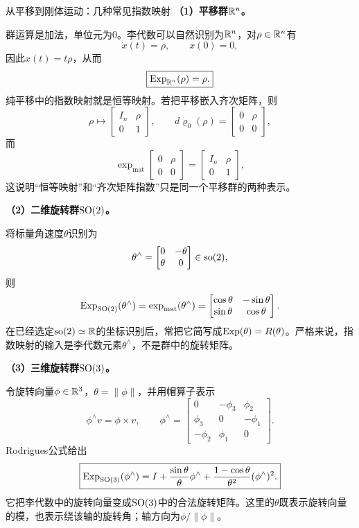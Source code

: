 \begin{lieexample}{从平移到刚体运动：几种常见指数映射}
\textbf{（1）平移群$\mathbb{R}^n$。}

群运算是加法，单位元为$0$。李代数可以自然识别为$\mathbb{R}^n$，对$\rho\in\mathbb{R}^n$有
\[
    \dot x(t)=\rho,
    \qquad x(0)=0,
\]
因此$x(t)=t\rho$，从而
\[
    \boxed{\operatorname{Exp}_{\mathbb{R}^n}(\rho)=\rho.}
\]
纯平移中的指数映射就是恒等映射。若把平移嵌入齐次矩阵，则
\[
    \rho\longmapsto
    \begin{bmatrix}I_n&\rho\\0&1\end{bmatrix},
    \qquad
    d\varrho_0(\rho)=
    \begin{bmatrix}0&\rho\\0&0\end{bmatrix},
\]
而
\[
    \exp_{\mathrm{mat}}
    \begin{bmatrix}0&\rho\\0&0\end{bmatrix}
    =
    \begin{bmatrix}I_n&\rho\\0&1\end{bmatrix},
\]
这说明“恒等映射”和“齐次矩阵指数”只是同一个平移群的两种表示。

\textbf{（2）二维旋转群$\operatorname{SO}(2)$。}

将标量角速度$\theta$识别为
\[
    \theta^\wedge=
    \begin{bmatrix}0&-\theta\\\theta&0\end{bmatrix}
    \in\operatorname{so}(2),
\]
则
\[
    \operatorname{Exp}_{\operatorname{SO}(2)}(\theta^\wedge)
    =\exp_{\mathrm{mat}}(\theta^\wedge)
    =
    \begin{bmatrix}
        \cos\theta&-\sin\theta\\
        \sin\theta&\cos\theta
    \end{bmatrix}.
\]
在已经选定$\operatorname{so}(2)\simeq\mathbb{R}$的坐标识别后，常把它简写成$\operatorname{Exp}(\theta)=R(\theta)$。严格来说，指数映射的输入是李代数元素$\theta^\wedge$，不是群中的旋转矩阵。

\textbf{（3）三维旋转群$\operatorname{SO}(3)$。}

令旋转向量$\phi\in\mathbb{R}^3$，$\theta=\|\phi\|$，并用帽算子表示
\[
    \phi^\wedge v=\phi\times v,
    \qquad
    \phi^\wedge=
    \begin{bmatrix}
        0&-\phi_3&\phi_2\\
        \phi_3&0&-\phi_1\\
        -\phi_2&\phi_1&0
    \end{bmatrix}.
\]
Rodrigues公式给出
\[
    \boxed{
    \operatorname{Exp}_{\operatorname{SO}(3)}(\phi^\wedge)
    =I+\frac{\sin\theta}{\theta}\phi^\wedge
    +\frac{1-\cos\theta}{\theta^2}(\phi^\wedge)^2.
    }
\]
它把李代数中的旋转向量变成$\operatorname{SO}(3)$中的合法旋转矩阵。这里的$\theta$既表示旋转向量的模，也表示绕该轴的旋转角；轴方向为$\phi/\|\phi\|$。


\end{lieexample}
